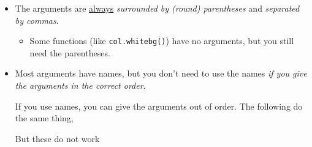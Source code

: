 \vspace{-5mm}
\begin{itemize}
\item The arguments are \underline{always} \emph{surrounded by (round) parentheses} and 
\emph{separated by commas}.
\begin{itemize}
\item
Some functions (like \verb!col.whitebg()!) 
have no arguments, but you still need the parentheses.
\end{itemize}
\item
Most arguments have names, but you don't need to use the names \emph{if you 
give the arguments in the correct order}.  

If you use names, you can give the arguments out of order.  
The following do the same thing,

\begin{knitrout}
\end{knitrout}

But these do not work


\end{itemize}
